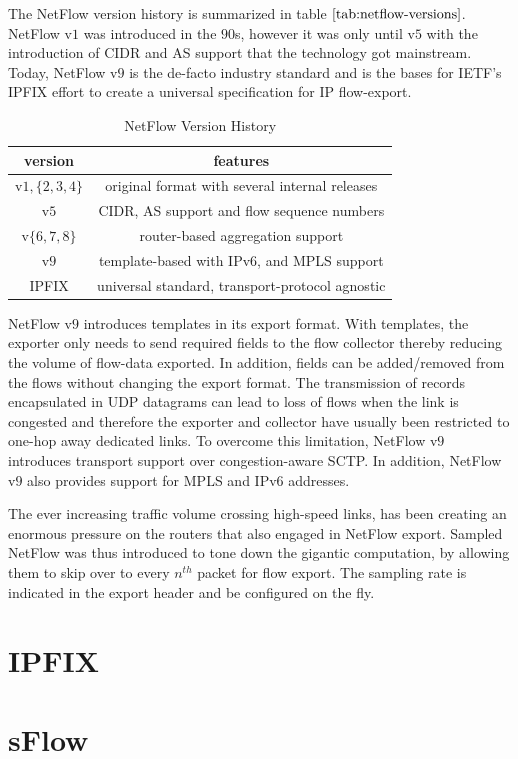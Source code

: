 The NetFlow version history is summarized in table $\ref{tab:netflow-versions}$. NetFlow v$1$ was introduced in the $90$s, however it was only until v$5$ with the introduction of \ac{CIDR} and \ac{AS} support that the  technology got mainstream. Today, NetFlow v$9$ is the de-facto industry standard and is the bases for \ac{IETF}'s \ac{IPFIX} effort to create a universal specification for \ac{IP} flow-export. 
\begin{table}[h!]
	\begin{center}
		\begin{tabular}{|c|c|}
			\hline	
			version & features \\
			\hline
			\hline 
			v$1, \{2,3,4\}$ & original format with several internal releases \\
			\hline 
			v$5$ & \ac{CIDR}, \ac{AS} support and flow sequence numbers \\
			\hline
			v$\{6,7,8\}$ & router-based aggregation support \\
			\hline
			v$9$ & template-based with \ac{IP}v$6$, and \ac{MPLS} support \\
			\hline
			\ac{IPFIX} & universal standard, transport-protocol agnostic\\
			\hline
		\end{tabular}
	\end{center}
	\caption{NetFlow Version History}
\label{tab:netflow-versions}
\end{table}

NetFlow v$9$ introduces templates in its export format. With templates, the exporter only needs to send required fields to the flow collector thereby reducing the volume of flow-data exported. In addition, fields can be added/removed from the flows without changing the export format. The transmission  of records encapsulated in \ac{UDP} datagrams can lead to loss of flows when the link is congested and therefore the exporter and collector have usually been restricted to one-hop away dedicated links. To overcome this limitation, NetFlow v$9$ introduces transport support over congestion-aware \ac{SCTP}. In addition, NetFlow v$9$ also provides support for \ac{MPLS} and \ac{IP}v$6$ addresses. 

The ever increasing traffic volume crossing high-speed links, has been creating an enormous pressure on the routers that also engaged in NetFlow export. Sampled NetFlow was thus introduced  to tone down the gigantic computation, by allowing them to skip over to every $n^{th}$ packet for flow export. The sampling rate is indicated in the export header and be configured on the fly.


\section{IPFIX}\label{sec:ipfix}
\section{sFlow}\label{sec:sflow}